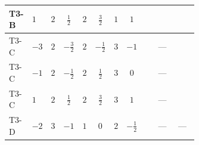 \documentclass[8pt]{article}
\begin{document}
\begin{landscape}
\begin{longtable}{@{}llcccccc >{\raggedright\arraybackslash}p{0.21\linewidth} >{\raggedright\arraybackslash}p{0.21\linewidth} >{\raggedright\arraybackslash}p{0.21\linewidth}@{}}
T3-B & $1$ & $2$ & $\frac{1}{2}$ & $2$ & $\frac{3}{2}$ & $1$ & $1$ & \scriptsize\adjustbox{max width=\linewidth}{$\begin{gathered} +6 {\lambda_{HS_1}^{(1)}} {\lambda_{S_1}^{(1)}}\end{gathered}$} & \scriptsize\adjustbox{max width=\linewidth}{$\begin{gathered} {\lambda_{HS_1}^{(1)}} (2 T_{\nu}^{(1)}+6 \operatorname{Tr}\!\left({Y_d}\,\left({Y_d}\right)^{\dagger}\right)+2 \operatorname{Tr}\!\left({Y_e}\,\left({Y_e}\right)^{\dagger}\right)+6 \operatorname{Tr}\!\left({Y_u}\,\left({Y_u}\right)^{\dagger}\right))\end{gathered}$} & \scriptsize\adjustbox{max width=\linewidth}{$\begin{gathered} +\frac{9 {g_2}^4}{4}\end{gathered}$} \\
\midrule
T3-C & $-3$ & $2$ & $-\frac{3}{2}$ & $2$ & $-\frac{1}{2}$ & $3$ & $-1$ & \scriptsize\adjustbox{max width=\linewidth}{$\begin{gathered} +6 {\lambda_{HS_1}^{(1)}} {\lambda_{S_1}^{(1)}}\end{gathered}$} & --- & \scriptsize\adjustbox{max width=\linewidth}{$\begin{gathered} +\frac{9 {g_2}^4}{4}\end{gathered}$} \\
\midrule
T3-C & $-1$ & $2$ & $-\frac{1}{2}$ & $2$ & $\frac{1}{2}$ & $3$ & $0$ & \scriptsize\adjustbox{max width=\linewidth}{$\begin{gathered} +6 {\lambda_{HS_1}^{(1)}} {\lambda_{S_1}^{(1)}}\end{gathered}$} & --- & \scriptsize\adjustbox{max width=\linewidth}{$\begin{gathered} +\frac{9 {g_2}^4}{4}\end{gathered}$} \\
\midrule
T3-C & $1$ & $2$ & $\frac{1}{2}$ & $2$ & $\frac{3}{2}$ & $3$ & $1$ & \scriptsize\adjustbox{max width=\linewidth}{$\begin{gathered} +6 {\lambda_{HS_1}^{(1)}} {\lambda_{S_1}^{(1)}}\end{gathered}$} & --- & \scriptsize\adjustbox{max width=\linewidth}{$\begin{gathered} +\frac{9 {g_2}^4}{4}\end{gathered}$} \\
\midrule
T3-D & $-2$ & $3$ & $-1$ & $1$ & $0$ & $2$ & $-\frac{1}{2}$ & \scriptsize\adjustbox{max width=\linewidth}{$\begin{gathered} +8 {\lambda_{HS_1}^{(1)}} {\lambda_{S_1}^{(1)}}\end{gathered}$} & --- & --- \\

\end{longtable}
\end{landscape}
\end{document}
